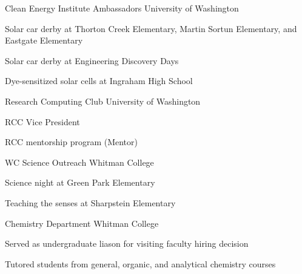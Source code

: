 


\begin{cventries}

\cventry
  {}
  {Clean Energy Institute Ambassadors} %
  {University of Washington} %
  {}
  {
    \begin{cvitems}
      \item{Solar car derby at Thorton Creek Elementary, Martin Sortun 
	    Elementary, and Eastgate Elementary}
      \item{Solar car derby at Engineering Discovery Days}
      \item{Dye-sensitized solar cells at Ingraham High School}
    \end{cvitems}
  }

\cventry
  {}
  {Research Computing Club} %
  {University of Washington} %
  {}
  {
    \begin{cvitems}
	  \item{RCC Vice President}
      \item{RCC mentorship program (Mentor)}
    \end{cvitems}
  }
   
\cventry
  {}
  {WC Science Outreach} %
  {Whitman College} %
  {}
  {
    \begin{cvitems}
      \item{Science night at Green Park Elementary}
      \item{Teaching the senses at Sharpstein Elementary}
    \end{cvitems}
  }

\cventry
  {}
  {Chemistry Department} %
  {Whitman College} %
  {}
  {
    \begin{cvitems}
      \item{Served as undergraduate liason for visiting faculty hiring decision}
      \item{Tutored students from general, organic, and analytical chemistry courses}
    \end{cvitems}
  }

\end{cventries}
